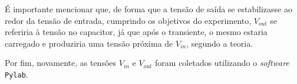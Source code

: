    É importante mencionar que, de forma que a tensão de saída se estabilizasse ao redor da tensão de entrada, cumprindo os objetivos do experimento, $V_{out}$ se referiria à tensão no capacitor, já que após o transiente, o mesmo estaria carregado e produziria uma tensão próxima de $V_{in}$, segundo a teoria.

    Por fim, novamente, as tensões $V_{in}$ e $V_{out}$ foram coletados utilizando o \textit{software} \texttt{Pylab}.

    

\pagebreak